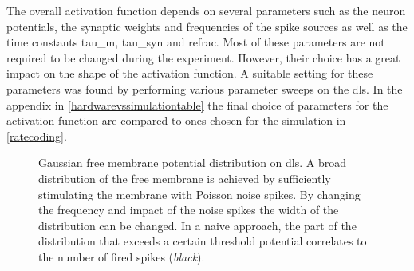 The overall activation function depends on several parameters such as the neuron potentials, the synaptic weights and frequencies of the spike sources as well as the time constants \gls{tau_m}, \gls{tau_syn} and \gls{refrac}. Most of these parameters are not required to be changed during the experiment. However, their choice has a great impact on the shape of the activation function. A suitable setting for these parameters was found by performing various parameter sweeps on the \gls{dls}. In the appendix in \cref{hardwarevssimulationtable} the final choice of parameters for the activation function are compared to ones chosen for the simulation in \cref{ratecoding}.
%
\begin{figure}
	\begin{center}
		
	\end{center}
	\caption[Gaussian free membrane potential distribution on \gls{dls}.]{Gaussian free membrane potential distribution on \gls{dls}. A broad distribution of the free membrane is achieved by sufficiently stimulating the membrane with Poisson noise spikes. By changing the frequency and impact of the noise spikes the width of the distribution can be changed. In a naive approach, the part of the distribution that exceeds a certain threshold potential correlates to the number of fired spikes (\textit{black}).}
	\label{vleak_w_noise}
\end{figure}

